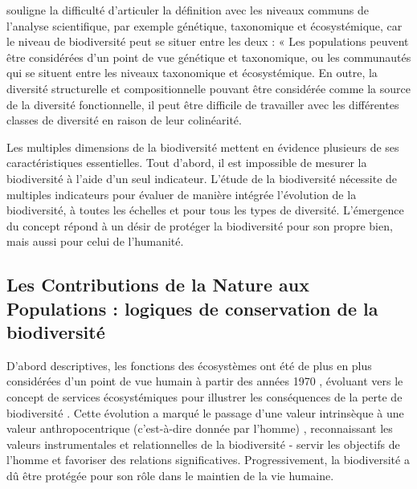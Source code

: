 \begin{displayquote}
\begin{displayquote}
\begin{displayquote}
{\cite{mouysset_diversity_2023} souligne la difficulté d'articuler la définition avec les niveaux communs de l'analyse scientifique, par exemple génétique, taxonomique et écosystémique, car le niveau de biodiversité peut se situer entre les deux : « Les populations peuvent être considérées d'un point de vue génétique et taxonomique, ou les communautés qui se situent entre les niveaux taxonomique et écosystémique. En outre, la diversité structurelle et compositionnelle pouvant être considérée comme la source de la diversité fonctionnelle, il peut être difficile de travailler avec les différentes classes de diversité en raison de leur colinéarité. 

Les multiples dimensions de la biodiversité mettent en évidence plusieurs de ses caractéristiques essentielles. Tout d'abord, il est impossible de mesurer la biodiversité à l'aide d'un seul indicateur. L'étude de la biodiversité nécessite de multiples indicateurs pour évaluer de manière intégrée l'évolution de la biodiversité, à toutes les échelles et pour tous les types de diversité. L'émergence du concept répond à un désir de protéger la biodiversité pour son propre bien, mais aussi pour celui de l'humanité. 

\clearpage

{}
\subsection*{Les Contributions de la Nature aux Populations : logiques de conservation de la biodiversité}

D'abord descriptives, les fonctions des écosystèmes ont été de plus en plus considérées d'un point de vue humain à partir des années 1970 \citep{hueting1969functions, schumacher1973small}, évoluant vers le concept de services écosystémiques \citep{ehrlich1981extinction} pour illustrer les conséquences de la perte de biodiversité \citep{gomez_history_2010}. Cette évolution a marqué le passage d'une valeur intrinsèque à une valeur anthropocentrique (c'est-à-dire donnée par l'homme) \citep{mouysset_diversity_2023}, reconnaissant les valeurs instrumentales et relationnelles de la biodiversité - servir les objectifs de l'homme et favoriser des relations significatives. Progressivement, la biodiversité a dû être protégée pour son rôle dans le maintien de la vie humaine.

}
\end{displayquote}
\end{displayquote}
\end{displayquote}
